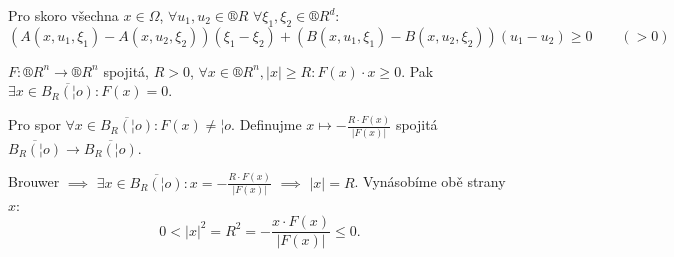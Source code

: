 \documentclass[12pt]{article}					%
\begin{document}
\begin{definice}
	Pro skoro všechna $x \in Ω$, $\forall u_1, u_2 \in ®R$ $\forall ξ_1, ξ_2 \in ®R^d$:
	$$ (A(x, u_1, ξ_1) - A(x, u_2, ξ_2))(ξ_1 - ξ_2) + (B(x, u_1, ξ_1) - B(x, u_2, ξ_2))(u_1 - u_2) ≥ 0 \qquad (> 0) $$
\end{definice}

\begin{lemma}
	$F: ®R^n \rightarrow ®R^n$ spojitá, $R > 0$, $\forall x \in ®R^n, |x| ≥ R: F(x)·x ≥ 0$. Pak $\exists x \in \overline{B_R(¦o)}: F(x) = 0$.

	\begin{dukazin}
		Pro spor $\forall x \in \overline{B_R(¦o)}: F(x) ≠ ¦o$. Definujme $x \mapsto -\frac{R·F(x)}{|F(x)|}$ spojitá $\overline{B_R(¦o)} \rightarrow \overline{B_R(¦o)}$.

		Brouwer $\implies$ $\exists x \in \overline{B_R(¦o)}: x = -\frac{R·F(x)}{|F(x)|}$ $\implies$ $|x| = R$. Vynásobíme obě strany $x$:
		$$ 0 < |x|^2 = R^2 = -\frac{x·F(x)}{|F(x)|} ≤ 0. $$
	\end{dukazin}
\end{lemma}
\end{document}
